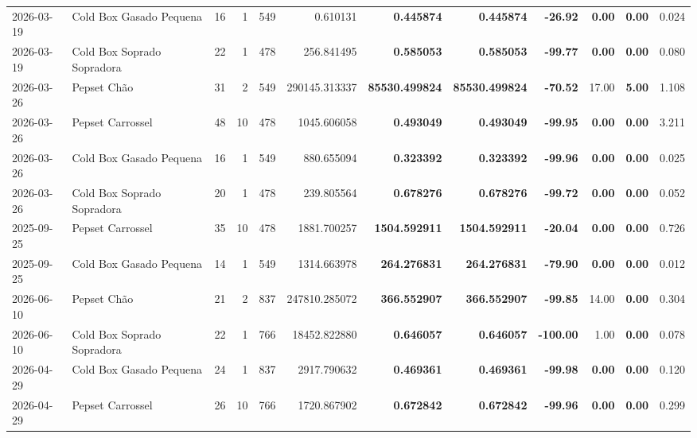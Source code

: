 {\begin{center}
{\begin{tabular}{@{}llrrrrrrrrrr@{}}
2026-03-19 & Cold Box Gasado Pequena & 16 & 1 & 549 & 0.610131 & \textbf{0.445874} & \textbf{0.445874} & \textbf{-26.92} & \textbf{0.00} & \textbf{0.00} & 0.024 \\
2026-03-19 & Cold Box Soprado Sopradora & 22 & 1 & 478 & 256.841495 & \textbf{0.585053} & \textbf{0.585053} & \textbf{-99.77} & \textbf{0.00} & \textbf{0.00} & 0.080 \\
2026-03-26 & Pepset Chão & 31 & 2 & 549 & 290145.313337 & \textbf{85530.499824} & \textbf{85530.499824} & \textbf{-70.52} & 17.00 & \textbf{5.00} & 1.108 \\
2026-03-26 & Pepset Carrossel & 48 & 10 & 478 & 1045.606058 & \textbf{0.493049} & \textbf{0.493049} & \textbf{-99.95} & \textbf{0.00} & \textbf{0.00} & 3.211 \\
2026-03-26 & Cold Box Gasado Pequena & 16 & 1 & 549 & 880.655094 & \textbf{0.323392} & \textbf{0.323392} & \textbf{-99.96} & \textbf{0.00} & \textbf{0.00} & 0.025 \\
2026-03-26 & Cold Box Soprado Sopradora & 20 & 1 & 478 & 239.805564 & \textbf{0.678276} & \textbf{0.678276} & \textbf{-99.72} & \textbf{0.00} & \textbf{0.00} & 0.052 \\
2025-09-25 & Pepset Carrossel & 35 & 10 & 478 & 1881.700257 & \textbf{1504.592911} & \textbf{1504.592911} & \textbf{-20.04} & \textbf{0.00} & \textbf{0.00} & 0.726 \\
2025-09-25 & Cold Box Gasado Pequena & 14 & 1 & 549 & 1314.663978 & \textbf{264.276831} & \textbf{264.276831} & \textbf{-79.90} & \textbf{0.00} & \textbf{0.00} & 0.012 \\
2026-06-10 & Pepset Chão & 21 & 2 & 837 & 247810.285072 & \textbf{366.552907} & \textbf{366.552907} & \textbf{-99.85} & 14.00 & \textbf{0.00} & 0.304 \\
2026-06-10 & Cold Box Soprado Sopradora & 22 & 1 & 766 & 18452.822880 & \textbf{0.646057} & \textbf{0.646057} & \textbf{-100.00} & 1.00 & \textbf{0.00} & 0.078 \\
2026-04-29 & Cold Box Gasado Pequena & 24 & 1 & 837 & 2917.790632 & \textbf{0.469361} & \textbf{0.469361} & \textbf{-99.98} & \textbf{0.00} & \textbf{0.00} & 0.120 \\
2026-04-29 & Pepset Carrossel & 26 & 10 & 766 & 1720.867902 & \textbf{0.672842} & \textbf{0.672842} & \textbf{-99.96} & \textbf{0.00} & \textbf{0.00} & 0.299 \\
\bottomrule
\end{tabular}%
}
\end{center}
}
\vspace*{\fill}
